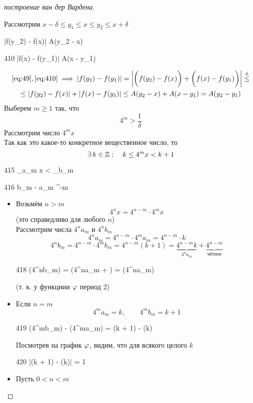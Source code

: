 \begin{proof}[построение ван дер Вардена]
\begin{itemize}
		Рассмотрим $ x - \delta \le y_1 \le x \le y_2 \le x + \delta $
		\begin{equ}{49}
			 \implies |f(y_2) - f(x)| \le A(y_2 - x)
		\end{equ}
		\begin{equ}{410}
			 \implies |f(x) - f(y_1)| \le A(x - y_1)
		\end{equ}
		\begin{multline*}
			\eref{49}, \eref{410} \implies |f(y_2) - f(y_1)| = \bigg| \bigg( f(y_2) - f(x) \bigg) + \bigg( f(x) - f(y_1) \bigg) \bigg| \trile \\
			\le |f(y_2) - f(x)| + |f(x) - f(y_1)| \le A(y_2 - x) + A(x - y_1) = A(y_2 - y_1)
		\end{multline*}
		Выберем $ m \ge 1 $ так, что
		$$ 4^m > \frac1\delta $$
		Рассмотрим число $ 4^mx $ \\
		Так как это какое-то конкретное вещественное число, то
		$$ \exists\, k \in \mathbb{Z} : \quad k \le 4^mx < k + 1 $$
		\begin{equ}{415}
			\implies {}_{\fed a_m} \le x < _{\fed b_m}
		\end{equ}
		\begin{equ}{416}
			b_m - a_m \bydef 4^{-m}
		\end{equ}
		\begin{itemize}
			\item Возьмём $ n > m $
			$$ 4^nx = 4^{n - m} \cdot 4^mx $$
			(это справедливо для любого $ n $) \\
			Рассмотрим числа $ 4^na_m $ и $ 4^nb_m $
			$$ 4^na_m = 4^{n - m} \cdot 4^ma_m = 4^{n - m} \cdot k $$
			$$ 4^nb_m = 4^{n - m} \cdot 4^mb_m = 4^{n - m}(k + 1) = \underbrace{4^{n - m}k}_{4^na_m} + \underbrace{4^{n - m}}_{\text{чётное}} $$
			\begin{equ}{418}
				\implies \vphi(4^nb_m) = \vphi(4^na_m + ) = \vphi(4^na_m)
			\end{equ}
			(т. к. у функциии $ \varphi $ период 2)
			\item Если $ n = m $
			$$ 4^ma_m = k, \qquad 4^mb_m = k + 1 $$
			\begin{equ}{419}
				\vphi(4^mb_m) - \vphi(4^ma_m) = \vphi(k + 1) - \vphi(k)
			\end{equ}
			Посмотрев на график $ \varphi $, видим, что для всякого целого $ k $
			\begin{equ}{420}
				|\vphi(k + 1) - \vphi(k)| = 1
			\end{equ}
			\item Пусть $ 0 < n < m $

\end{itemize}
\end{itemize}
\end{proof}
